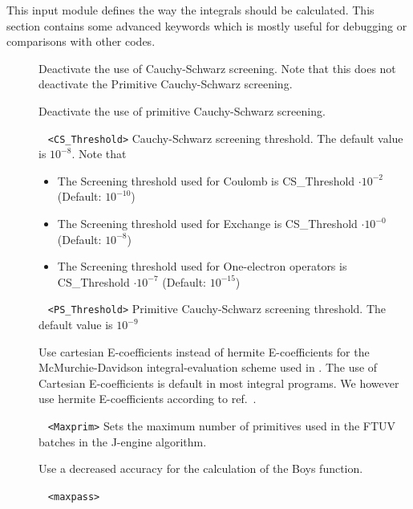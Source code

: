 This input module defines the way the integrals should be calculated. 
This section contains some advanced keywords which is mostly useful
for debugging or comparisons with other codes. 
\begin{description}

\item[] Deactivate the use of Cauchy-Schwarz screening. 
Note that this does not deactivate the Primitive Cauchy-Schwarz screening. 
\item[] Deactivate the use of primitive Cauchy-Schwarz screening.
\item[] 
\verb| | \newline
\verb|<CS_Threshold>|\newline
Cauchy-Schwarz screening threshold. The default value is $10^{-8}$. Note that 
\begin{itemize}
  \item The Screening threshold used for Coulomb is CS\_Threshold $\cdot 10^{-2}$ (Default: $10^{-10}$) 
  \item The Screening threshold used for Exchange is CS\_Threshold $\cdot 10^{-0}$ (Default: $10^{-8}$)
  \item The Screening threshold used for One-electron operators is CS\_Threshold $\cdot 10^{-7}$ (Default: $10^{-15}$)
\end{itemize}
\item[] 
\verb| | \newline
\verb|<PS_Threshold>|\newline
Primitive Cauchy-Schwarz screening threshold. The default value is $10^{-9}$
\item[] Use cartesian E-coefficients instead of hermite E-coefficients for the McMurchie-Davidson
integral-evaluation scheme \cite{McMurchie1978} used in \lsdalton. The use of Cartesian E-coefficients is 
default in most integral programs. We however use hermite E-coefficients according to ref.~\cite{reine:4771}.
\item[] 
\verb| | \newline
\verb|<Maxprim>|\newline
Sets the maximum number of primitives used in the FTUV batches in the J-engine algorithm.
\item[] Use a decreased accuracy for the calculation of the Boys function.
\item[] 
\verb| | \newline
\verb|<maxpass>|\newline

\end{description}
